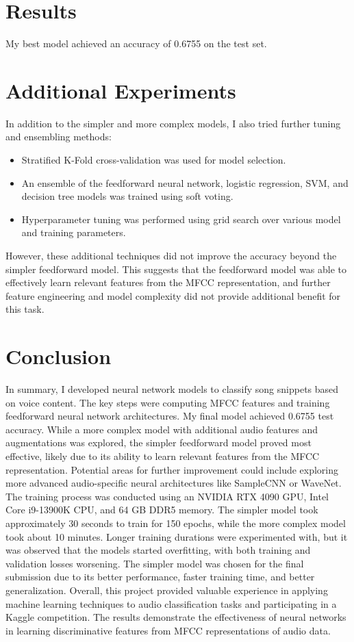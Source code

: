 \documentclass{article}
\begin{document}
\section{Results}
My best model achieved an accuracy of 0.6755 on the test set.
\section{Additional Experiments}
In addition to the simpler and more complex models, I also tried further tuning and ensembling methods:
\begin{itemize}
    \item Stratified K-Fold cross-validation was used for model selection.
    \item An ensemble of the feedforward neural network, logistic regression, SVM, and decision tree models was trained using soft voting.
    \item Hyperparameter tuning was performed using grid search over various model and training parameters.
\end{itemize}
However, these additional techniques did not improve the accuracy beyond the simpler feedforward model. This suggests that the feedforward model was able to effectively learn relevant features from the MFCC representation, and further feature engineering and model complexity did not provide additional benefit for this task.
\section{Conclusion}
In summary, I developed neural network models to classify song snippets based on voice content. The key steps were computing MFCC features and training feedforward neural network architectures. My final model achieved 0.6755 test accuracy.
While a more complex model with additional audio features and augmentations was explored, the simpler feedforward model proved most effective, likely due to its ability to learn relevant features from the MFCC representation. Potential areas for further improvement could include exploring more advanced audio-specific neural architectures like SampleCNN or WaveNet.
The training process was conducted using an NVIDIA RTX 4090 GPU, Intel Core i9-13900K CPU, and 64 GB DDR5 memory. The simpler model took approximately 30 seconds to train for 150 epochs, while the more complex model took about 10 minutes. Longer training durations were experimented with, but it was observed that the models started overfitting, with both training and validation losses worsening. The simpler model was chosen for the final submission due to its better performance, faster training time, and better generalization.
Overall, this project provided valuable experience in applying machine learning techniques to audio classification tasks and participating in a Kaggle competition. The results demonstrate the effectiveness of neural networks in learning discriminative features from MFCC representations of audio data.
\end{document}
